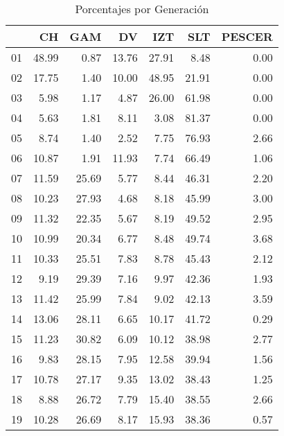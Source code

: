 \documentclass{article}
\begin{document}
\begin{table}[ht]
\centering
\caption{Porcentajes por Generación} 
\begin{tabular}{rrrrrrr}
  \hline
 & CH & GAM & DV & IZT & SLT & PESCER \\ 
  \hline
01 & 48.99 & 0.87 & 13.76 & 27.91 & 8.48 & 0.00 \\ 
  02 & 17.75 & 1.40 & 10.00 & 48.95 & 21.91 & 0.00 \\ 
  03 & 5.98 & 1.17 & 4.87 & 26.00 & 61.98 & 0.00 \\ 
  04 & 5.63 & 1.81 & 8.11 & 3.08 & 81.37 & 0.00 \\ 
  05 & 8.74 & 1.40 & 2.52 & 7.75 & 76.93 & 2.66 \\ 
  06 & 10.87 & 1.91 & 11.93 & 7.74 & 66.49 & 1.06 \\ 
  07 & 11.59 & 25.69 & 5.77 & 8.44 & 46.31 & 2.20 \\ 
  08 & 10.23 & 27.93 & 4.68 & 8.18 & 45.99 & 3.00 \\ 
  09 & 11.32 & 22.35 & 5.67 & 8.19 & 49.52 & 2.95 \\ 
  10 & 10.99 & 20.34 & 6.77 & 8.48 & 49.74 & 3.68 \\ 
  11 & 10.33 & 25.51 & 7.83 & 8.78 & 45.43 & 2.12 \\ 
  12 & 9.19 & 29.39 & 7.16 & 9.97 & 42.36 & 1.93 \\ 
  13 & 11.42 & 25.99 & 7.84 & 9.02 & 42.13 & 3.59 \\ 
  14 & 13.06 & 28.11 & 6.65 & 10.17 & 41.72 & 0.29 \\ 
  15 & 11.23 & 30.82 & 6.09 & 10.12 & 38.98 & 2.77 \\ 
  16 & 9.83 & 28.15 & 7.95 & 12.58 & 39.94 & 1.56 \\ 
  17 & 10.78 & 27.17 & 9.35 & 13.02 & 38.43 & 1.25 \\ 
  18 & 8.88 & 26.72 & 7.79 & 15.40 & 38.55 & 2.66 \\ 
  19 & 10.28 & 26.69 & 8.17 & 15.93 & 38.36 & 0.57 \\ 
   \hline
\end{tabular}
\end{table}
\end{document}
